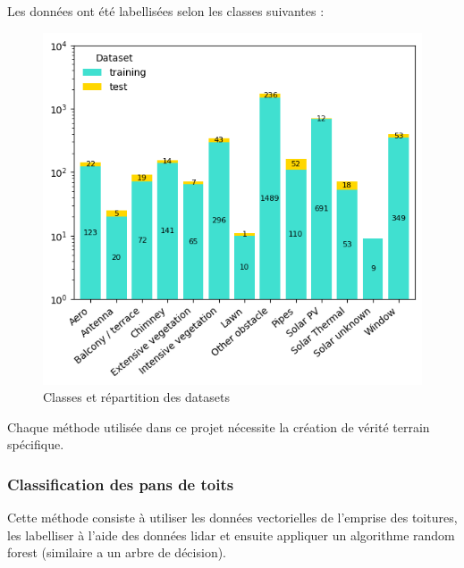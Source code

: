 {{\begin{itemize}
\end{itemize}
\par{Les données ont été labellisées selon les classes suivantes :}
\begin{figure}[H]
    \centering
    \includegraphics[width=1\linewidth]{02-main//figures/stdl_03_classes.png}
    \caption{Classes et répartition des datasets}
    \label{fig:stdl_03_classes}
\end{figure}
\par{Chaque méthode utilisée dans ce projet nécessite la création de vérité terrain spécifique.}

\subsubsection{Classification des pans de toits}
\par{Cette méthode consiste à utiliser les données vectorielles de l'emprise des toitures, les labelliser à l'aide des données \gls{lidar} et ensuite appliquer un algorithme random forest (similaire a un arbre de décision).}

}}
